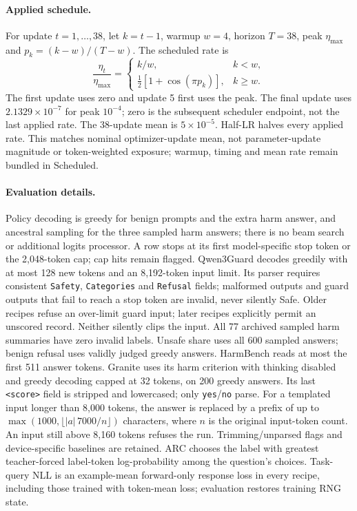 \documentclass[11pt]{article}
\begin{document}
\paragraph{Applied schedule.} For update $t=1,\ldots,38$, let $k=t-1$,
warmup $w=4$, horizon $T=38$, peak $\eta_{\max}$ and
$p_k=(k-w)/(T-w)$. The scheduled rate is
\[
\frac{\eta_t}{\eta_{\max}}=
\begin{cases}
 k/w,&k<w,\\
 \tfrac12[1+\cos(\pi p_k)],&k\geq w.
\end{cases}
\]
The first update uses zero and update 5 first uses the peak. The final
update uses $2.1329\times10^{-7}$ for peak $10^{-4}$; zero is the subsequent
scheduler endpoint, not the last applied rate. The 38-update mean is
$5\times10^{-5}$. Half-LR halves every applied rate. This matches nominal
optimizer-update mean, not parameter-update magnitude or token-weighted
exposure; warmup, timing and mean rate remain bundled in Scheduled.

\paragraph{Evaluation details.} Policy decoding is greedy for benign prompts
and the extra harm answer, and ancestral sampling for the three sampled
harm answers; there is no beam search or additional logits processor.
A row stops at its first model-specific stop token or the 2,048-token cap;
cap hits remain flagged. Qwen3Guard decodes greedily with at most 128 new
tokens and an 8,192-token input limit. Its parser requires consistent
\texttt{Safety}, \texttt{Categories} and \texttt{Refusal} fields; malformed
outputs and guard outputs that fail to reach a stop token are invalid, never
silently Safe. Older recipes refuse an over-limit guard input; later recipes explicitly
permit an unscored record. Neither silently clips the input. All 77 archived sampled
harm summaries have zero invalid labels. Unsafe share uses all 600 sampled
answers; benign refusal uses validly judged greedy answers. HarmBench reads
at most the first 511 answer tokens. Granite uses its harm criterion with
thinking disabled and greedy decoding capped at 32 tokens, on 200 greedy
answers. Its last \texttt{<score>} field is stripped and lowercased; only
\texttt{yes}/\texttt{no} parse. For a templated input longer than 8,000
tokens, the answer is replaced by a prefix of up to
$\max(1000,\lfloor |a|\,7000/n\rfloor)$ characters, where $n$ is the original
input-token count. An input still above 8,160 tokens refuses the run.
Trimming/unparsed flags and device-specific baselines are retained. ARC chooses the label with greatest teacher-forced
label-token log-probability among the question's choices. Task-query NLL is
an example-mean forward-only response loss in every recipe, including
those trained with token-mean loss; evaluation restores training RNG state.
\end{document}
